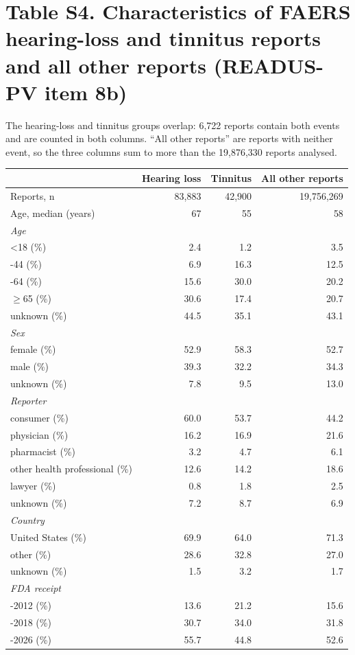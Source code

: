 \documentclass[10pt]{article}
\begin{document}
\section*{Table S4. Characteristics of FAERS hearing-loss and tinnitus reports and all other reports (READUS-PV item 8b)}
The hearing-loss and tinnitus groups overlap: 6{,}722 reports contain both events and are counted in both columns.
``All other reports'' are reports with neither event, so the three columns sum to more than the 19{,}876{,}330 reports analysed.
\begin{longtable}{lrrr}
\toprule
 & Hearing loss & Tinnitus & All other reports \\
\midrule
Reports, n & 83,883 & 42,900 & 19,756,269 \\
Age, median (years) & 67 & 55 & 58 \\
\textit{Age} & & & \\
\quad <18 (\%) & 2.4 & 1.2 & 3.5 \\
\quad 18-44 (\%) & 6.9 & 16.3 & 12.5 \\
\quad 45-64 (\%) & 15.6 & 30.0 & 20.2 \\
\quad $\geq$65 (\%) & 30.6 & 17.4 & 20.7 \\
\quad unknown (\%) & 44.5 & 35.1 & 43.1 \\
\textit{Sex} & & & \\
\quad female (\%) & 52.9 & 58.3 & 52.7 \\
\quad male (\%) & 39.3 & 32.2 & 34.3 \\
\quad unknown (\%) & 7.8 & 9.5 & 13.0 \\
\textit{Reporter} & & & \\
\quad consumer (\%) & 60.0 & 53.7 & 44.2 \\
\quad physician (\%) & 16.2 & 16.9 & 21.6 \\
\quad pharmacist (\%) & 3.2 & 4.7 & 6.1 \\
\quad other health professional (\%) & 12.6 & 14.2 & 18.6 \\
\quad lawyer (\%) & 0.8 & 1.8 & 2.5 \\
\quad unknown (\%) & 7.2 & 8.7 & 6.9 \\
\textit{Country} & & & \\
\quad United States (\%) & 69.9 & 64.0 & 71.3 \\
\quad other (\%) & 28.6 & 32.8 & 27.0 \\
\quad unknown (\%) & 1.5 & 3.2 & 1.7 \\
\textit{FDA receipt} & & & \\
\quad 2004-2012 (\%) & 13.6 & 21.2 & 15.6 \\
\quad 2013-2018 (\%) & 30.7 & 34.0 & 31.8 \\
\quad 2019-2026 (\%) & 55.7 & 44.8 & 52.6 \\
\bottomrule
\end{longtable}
\end{document}
